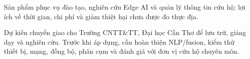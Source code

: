 Sản phẩm phục vụ đào tạo, nghiên cứu Edge AI và quản lý thông tin cứu hộ; lợi ích về thời gian, chi phí và giảm thiệt hại chưa được đo thực địa.

Dự kiến chuyển giao cho Trường CNTT\&TT, Đại học Cần Thơ để lưu trữ, giảng dạy và nghiên cứu. Trước khi áp dụng, cần hoàn thiện NLP/fusion, kiểm thử thiết bị, mạng, đồng bộ, phân cụm và đánh giá với đơn vị cứu hộ chuyên môn.
